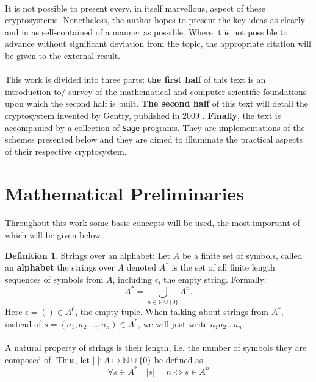 \documentclass{article}
\theoremstyle{definition}
\newtheorem{definition}{Definition}[section]
\theoremstyle{example}
\newcommand{\Nat}{\mathbb{N}}
\begin{document}
\paragraph{}
It is not possible to present every, in itself marvellous, aspect of these
cryptosystems. Nonetheless, the author hopes to present the key ideas as
clearly and in as self-contained of a manner as possible. Where it is not
possible to advance without significant deviation from the topic, the
appropriate citation will be given to the external result.
\paragraph{}
This work is divided into three parts: \textbf{the first half} of this text is an
introduction to/ survey of the mathematical and computer scientific foundations
upon which the second half is built. \textbf{The second half} of this text will
detail the cryptosystem invented by Gentry, published in 2009
\cite{gentry2009fully}. \textbf{Finally}, the text is accompanied by a
collection of \texttt{Sage} \cite{SageMath} programs. They are implementations
of the schemes presented below and they are aimed to illuminate the practical
aspects of their respective cryptosystem.

\section{Mathematical Preliminaries}
\paragraph{}
Throughout this work some basic concepts will be used, the most important of
which will be given below.
\begin{definition}{Strings over an alphabet:}
  Let $A$ be a finite set of symbols, called an \textbf{alphabet} the strings
  over $A$ denoted $A^*$ is the set of all finite length sequences of
  symbols from $A$, including $\epsilon$, the empty string. Formally:
  \[
    A^* = \bigcup_{n\in \Nat \cup \{0\}} A^n.
  \]
  Here $\epsilon = () \in A^0$, the empty tuple. When talking about strings from $A^*$, instead of $s = (a_1, a_2, \hdots, a_n)
  \in A^*$, we will just write $a_1a_2\hdots a_n$.
\end{definition}
\paragraph{}
A natural property of strings is their length, i.e. the number of symbols they
are composed of. Thus, let $|\cdot| : A
\mapsto \Nat \cup \{0\}$ be defined as
\[
  \forall s \in A^* \quad |s| = n \Leftrightarrow s \in A^n
\]
\end{document}
